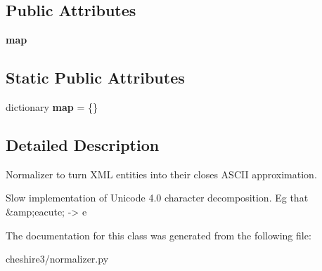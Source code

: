 \subsection*{Public Attributes}
\begin{DoxyCompactItemize}
\item 
\hypertarget{classcheshire3_1_1normalizer_1_1_diacritic_normalizer_adff689ef784be8dc327aa695064b6835}{{\bfseries map}}\label{classcheshire3_1_1normalizer_1_1_diacritic_normalizer_adff689ef784be8dc327aa695064b6835}

\end{DoxyCompactItemize}
\subsection*{Static Public Attributes}
\begin{DoxyCompactItemize}
\item 
\hypertarget{classcheshire3_1_1normalizer_1_1_diacritic_normalizer_a038fdae30412f1df0410f18204a9b1f7}{dictionary {\bfseries map} = \{\}}\label{classcheshire3_1_1normalizer_1_1_diacritic_normalizer_a038fdae30412f1df0410f18204a9b1f7}

\end{DoxyCompactItemize}


\subsection{Detailed Description}
\begin{DoxyVerb}Normalizer to turn XML entities into their closes ASCII approximation.

Slow implementation of Unicode 4.0 character decomposition.
Eg that &amp;eacute; -> e
\end{DoxyVerb}
 

The documentation for this class was generated from the following file\-:\begin{DoxyCompactItemize}
\item 
cheshire3/normalizer.\-py\end{DoxyCompactItemize}
